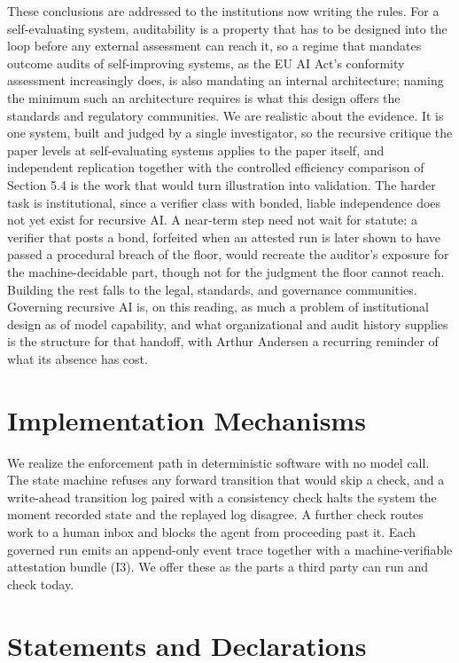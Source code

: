 \documentclass[11pt]{article}
\begin{document}
These conclusions are addressed to the institutions now writing the rules. For a self-evaluating system, auditability is a property that has to be designed into the loop before any external assessment can reach it, so a regime that mandates outcome audits of self-improving systems, as the EU AI Act's conformity assessment increasingly does, is also mandating an internal architecture; naming the minimum such an architecture requires is what this design offers the standards and regulatory communities. We are realistic about the evidence. It is one system, built and judged by a single investigator, so the recursive critique the paper levels at self-evaluating systems applies to the paper itself, and independent replication together with the controlled efficiency comparison of Section 5.4 is the work that would turn illustration into validation. The harder task is institutional, since a verifier class with bonded, liable independence does not yet exist for recursive AI. A near-term step need not wait for statute: a verifier that posts a bond, forfeited when an attested run is later shown to have passed a procedural breach of the floor, would recreate the auditor's exposure for the machine-decidable part, though not for the judgment the floor cannot reach. Building the rest falls to the legal, standards, and governance communities. Governing recursive AI is, on this reading, as much a problem of institutional design as of model capability, and what organizational and audit history supplies is the structure for that handoff, with Arthur Andersen a recurring reminder of what its absence has cost.

\appendix
\section{Implementation Mechanisms}
We realize the enforcement path in deterministic software with no model call. The state machine refuses any forward transition that would skip a check, and a write-ahead transition log paired with a consistency check halts the system the moment recorded state and the replayed log disagree. A further check routes work to a human inbox and blocks the agent from proceeding past it. Each governed run emits an append-only event trace together with a machine-verifiable attestation bundle (I3). We offer these as the parts a third party can run and check today.

\section{Statements and Declarations}
\end{document}
